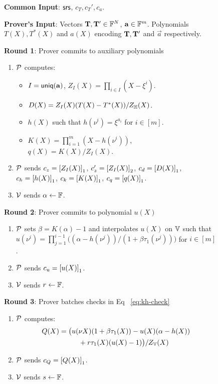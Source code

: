 \begin{figure}[htbp]
    \begin{mdframed}

        {\bf Common Input}: $\mathsf{srs}$, $c_T, c_T', c_a$.

        {\bf Prover's Input}: Vectors $\mathbf{T},\mathbf{T}'\in \mathbb{F}^N$, $\mathbf{a}\in \mathbb{F}^m$. Polynomials $T(X),T^*(X)$ and
        $a(X)$ encoding $\mathbf{T},\mathbf{T}'$ and $\vec{a}$ respectively.

        {\bf Round 1}: Prover commits to auxiliary polynomials
        \begin{enumerate}[leftmargin=1em, label=\arabic*.]
            \item $\mathcal{P}$ computes:
                \begin{itemize}[leftmargin=1em, label=-]
                \item $I=\mathsf{uniq}(\mathbf{{a}})$, $Z_I(X)=\prod_{i\in I}(X-\xi^i)$.
                \item $D(X)=Z_I(X)(T(X) - T^*(X))/Z_\mathbb{H}(X)$.
                \item $h(X)$ such that $h(\nu^i)=\xi^{a_i}$ for $i\in [m]$.
                \item $K(X)=\prod_{i=1}^m (X - h(\nu^i))$, $q(X)=K(X)/Z_I(X)$.
                \end{itemize}
            \item $\mathcal{P}$ sends $c_z = \left[{Z_I(X)}\right]_1$, $c_z'=\left[{Z_I(X)}\right]_2$, $c_d=\left[{D(X)}\right]_1$, $c_h=\left[{h(X)}\right]_1$, $c_k=\left[{K(X)}\right]_1$,
            $c_q=\left[{q(X)}\right]_1$.
            \item $\mathcal{V}$ sends $\alpha\gets \mathbb{F}$.
        \end{enumerate}

        {\bf Round 2}: Prover commits to polynomial $u(X)$
        \begin{enumerate}[leftmargin=1em, label=\arabic*.]
            \item $\mathcal{P}$ sets $\beta=K(\alpha)-1$ and interpolates $u(X)$ on $\mathbb{V}$ such that
                $u(\nu^i)=\prod_{j=1}^{i-1}\big((\alpha - h(\nu^j))/(1 + \beta\tau_1(\nu^j))\big)$ for $i\in [m]$.
            \item $\mathcal{P}$ sends $c_u=\left[{u(X)}\right]_1$.
            \item $\mathcal{V}$ sends $r\gets \mathbb{F}$.
        \end{enumerate}


        {\bf Round 3}: Prover batches checks in Eq ~\eqref{eq:kh-check}
        \begin{enumerate}[leftmargin=1em, label=\arabic*.]
            \item $\mathcal{P}$ computes:
            \begin{align*}
            Q(X)=\big(&u(\nu X)(1+\beta \tau_1(X)) - u(X)(\alpha - h(X)) \\
            &\quad + r\tau_1(X)(u(X)-1)\big)/Z_{\mathbb{V}}(X)
            \end{align*}
            \item $\mathcal{P}$ sends $c_Q = \left[{Q(X)}\right]_1$.
            \item $\mathcal{V}$ sends $s\gets \mathbb{F}$.
        \end{enumerate}


\end{mdframed}
\end{figure}
